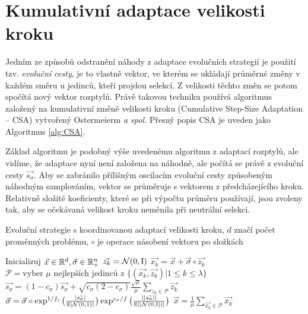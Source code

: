 \section{Kumulativní adaptace velikosti kroku}

Jedním ze způsobů odstranění náhody z adaptace evolučních strategií je použití tzv. \emph{evoluční cesty}, je to vlastně vektor, ve kterém se ukládají průměrné změny v každém směru u jedinců, kteří projdou selekcí. Z velikosti těchto změn se potom spočítá nový vektor rozptylů. Právě takovou techniku používá algoritmus založený na kumulativní změně velikosti kroku (Cumulative Step-Size Adaptation -- CSA) vytvořený Ostermeierm \emph{a spol.}\cite{Ostermeier1994} Přesný popis CSA je uveden jako Algoritmus \ref{alg:CSA}. 

Základ algoritmu je podobný výše uvedenému algoritmu z adaptací rozptylů, ale vidíme, že adaptace nyní není založena na náhodně, ale počítá se právě z evoluční cesty $\vec{s_\sigma}$. Aby se zabránilo přílišným oscilacím evoluční cesty způsobeným náhodným samplováním, vektor se průměruje s vektorem z předcházejícího kroku. Relativně složité koeficienty, které se při výpočtu průměru používají, jsou zvoleny tak, aby se očekávaná velikost kroku neměnila při neutrální selekci.

\begin{algorithm}
\caption{Evoluční strategie s koordinovanou adaptací velikosti kroku, $d$ značí počet proměnných problému, $\circ$ je operace násobení vektoru po složkách}
\label{alg:CSA}
\begin{algorithmic}[1]
\State Inicializuj $\vec{x} \in {\ensuremath{\mathbb{R}}}^d, \vec{\sigma} \in {\ensuremath{\mathbb{R}}}^n_+$
	  \State $\vec{z_k} = \mathcal{N}(0, \mathrm{I})$
	  \State $\vec{x_k} = \vec{x} + \vec{\sigma} \circ \vec{z_k}$ 
	\EndFor
	\State $\mathcal{P} = \text{vyber } \mu \text{ nejlepších jedinců z } \{(\vec{x_k}, \vec{z_k}) | 1 \leq k \leq \lambda\}$
	\State $\vec{s_\sigma} = (1 - c_\sigma)\vec{s_\sigma} + \sqrt{c_\sigma(2-c_\sigma)}\frac{\sqrt{\mu}}{\mu}\sum_{z_k \in \mathcal{P}}\vec{z_k} $ 
	\State $\vec{\sigma} = \vec{\sigma} \circ \exp^{1/f_i}\big(\frac{|\vec{s_\sigma}|}{\mathbb{E}|\mathcal{N}(0, 1)|}\big)\exp^{c_\sigma/f}\big(\frac{||\vec{s_\sigma}||}{\mathbb{E}||\mathcal{N}(0, \mathrm{I})||} \big)$
	\State $\vec{x} = \frac{1}{\mu} \sum_{\vec{x_k}\in\mathcal{P}}\vec{x_k}$ 
\EndWhile
\EndProcedure
\end{algorithmic}
\end{algorithm}

